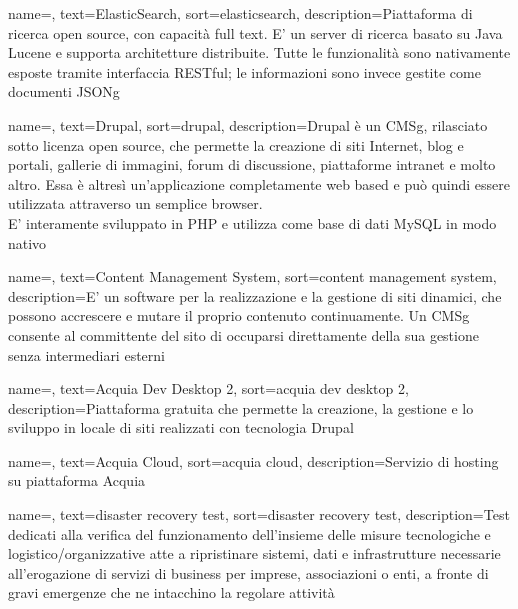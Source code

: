{
	name=,
	text=ElasticSearch,
	sort=elasticsearch,
	description={Piattaforma di ricerca \gls{open source}, con capacità full text. E' un server di ricerca basato su \gls{Java Lucene} e supporta architetture distribuite. Tutte le funzionalità sono nativamente esposte tramite interfaccia \gls{RESTful}; le informazioni sono invece gestite come documenti \gls{JSONg}}
}

{
	name=,
	text=Drupal,
	sort=drupal,
	description={Drupal è un \gls{CMSg}, rilasciato sotto licenza \gls{open source}, che permette la creazione di siti Internet, blog e portali, gallerie di immagini, forum di discussione, piattaforme intranet e molto altro. Essa è altresì un’applicazione completamente web based e può quindi essere utilizzata attraverso un semplice browser. \\
		E' interamente sviluppato in \gls{PHP} e utilizza come base di dati \gls{MySQL} in modo nativo}
}

{
	name=,
	text=Content Management System,
	sort=content management system,
	description={E’ un software per la realizzazione e la gestione di siti dinamici, che possono accrescere e mutare il proprio contenuto continuamente. Un \gls{CMSg} consente al committente del sito di occuparsi direttamente della sua gestione senza intermediari esterni}
}

{
	name=,
	text=Acquia Dev Desktop 2,
	sort=acquia dev desktop 2,
	description={Piattaforma gratuita che permette la creazione, la gestione e lo sviluppo in locale di siti realizzati con tecnologia \gls{Drupal}}
}

{
	name=,
	text=Acquia Cloud,
	sort=acquia cloud,
	description={Servizio di hosting su piattaforma Acquia}
}

{
	name=,
	text=disaster recovery test,
	sort=disaster recovery test,
	description={Test dedicati alla verifica del funzionamento dell'insieme delle misure tecnologiche e logistico/organizzative atte a ripristinare sistemi, dati e infrastrutture necessarie all'erogazione di servizi di business per imprese, associazioni o enti, a fronte di gravi emergenze che ne intacchino la regolare attività}
}


